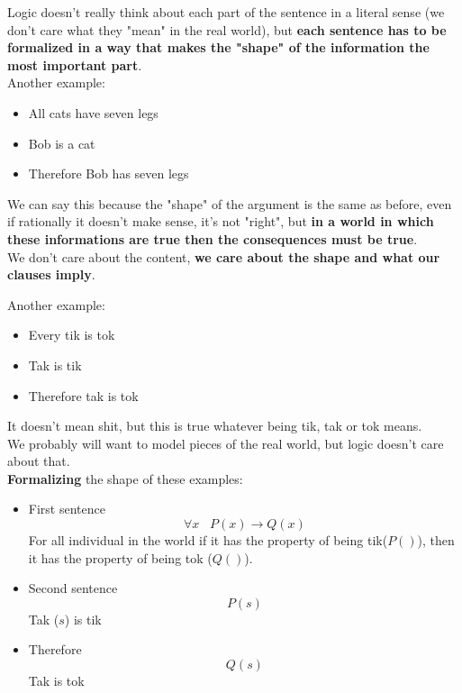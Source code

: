 \documentclass[11pt]{article}
\begin{document}
	Logic doesn't really think about each part of the sentence in a literal sense (we don't care what they "mean" in the real world), but \textbf{each sentence has to be formalized in a way that makes the "shape" of the information the most important part}. \\
	
	Another example: 
	\begin{itemize}
		\item All cats have seven legs 
		\item Bob is a cat 
		\\ \bline
		\item Therefore Bob has seven legs
	\end{itemize}
	 
	We can say this because the "shape" of the argument is the same as before, even if rationally it doesn't make sense, it's not "right", but \textbf{in a world in which these informations are true then the consequences must be true}.\\
	
	We don't care about the content, \textbf{we care about the shape and what our clauses imply}.  \\
	
	\newpage
	
	Another example: 
	\begin{itemize}
		\item Every tik is tok
		\item Tak is tik 
		\\ \bline
		\item Therefore tak is tok
	\end{itemize}
	
	It doesn't mean shit, but this is true whatever being tik, tak or tok means. \\
	
	We probably will want to model pieces of the real world, but logic doesn't care about that. \\
	
	\textbf{Formalizing} the shape of these examples:
	\begin{itemize}
		\item First sentence
		$$ \forall x \;\;\;  P(x) \rightarrow Q(x) $$
		For all individual in the world if it has the property of being tik($P()$), then it has the property of being tok ($Q()$).
		
		\item Second sentence 
		$$ P(s) $$
		Tak ($s$) is tik 
		\\ \bline
		
		\item Therefore 
		$$ Q(s) $$
		Tak is tok
	\end{itemize}
	
\end{document}
